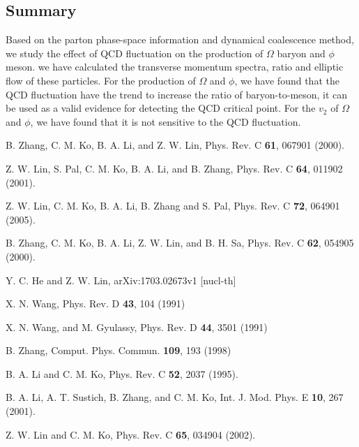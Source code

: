 \documentclass[twocolumn,aps,prc,showpacs,superscriptaddress,preprintnumbers,floatfix,nofootinbib]{revtex4}
\begin{document}
\begin{CJK*}{GBK}{song}
\section{Summary}
Based on the parton phase-space information and dynamical coalescence method, we study the effect
of QCD fluctuation on the production of $\Omega$ baryon and $\phi$ meson. we have calculated the
transverse momentum spectra, ratio and elliptic flow of these particles. For the production of
$\Omega$ and $\phi$, we have found that the QCD fluctuation have the trend to increase the ratio
of baryon-to-meson, it can be used as a valid evidence for detecting the QCD critical point.
For the $v_{2}$ of $\Omega$ and $\phi$, we have found that it is not sensitive to the QCD
fluctuation.















\begin{thebibliography}{88}
 B. Zhang, C. M. Ko, B. A. Li, and Z. W. Lin, Phys. Rev. C
  \textbf{61}, 067901 (2000).

 Z. W. Lin, S. Pal, C. M. Ko, B. A. Li, and B. Zhang, Phys. Rev. C
  \textbf{64}, 011902 (2001).

 Z. W. Lin, C. M. Ko, B. A. Li, B. Zhang and S. Pal, Phys. Rev. C
  \textbf{72}, 064901 (2005).

 B. Zhang, C. M. Ko, B. A. Li, Z. W. Lin, and B. H. Sa, Phys. Rev. C
  \textbf{62}, 054905 (2000).

 Y. C. He and Z. W. Lin, arXiv:1703.02673v1 [nucl-th]

 X. N. Wang, Phys. Rev. D
  \textbf{43}, 104 (1991)

 X. N. Wang, and M. Gyulassy, Phys. Rev. D
  \textbf{44}, 3501 (1991)

 B. Zhang, Comput. Phys. Commun.
  \textbf{109}, 193 (1998)

 B. A. Li and C. M. Ko, Phys. Rev. C
  \textbf{52}, 2037 (1995).

 B. A. Li, A. T. Sustich, B. Zhang, and C. M. Ko, Int. J. Mod. Phys. E
  \textbf{10}, 267 (2001).

 Z. W. Lin and C. M. Ko, Phys. Rev. C
  \textbf{65}, 034904 (2002).


\end{thebibliography}
\end{CJK*}
\end{document}
